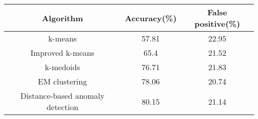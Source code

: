 \begin{table}[]
    \centering
    \begin{tabular}{@{}clllclcl@{}}
    \toprule
    \multicolumn{4}{c}{Algorithm}                          & \multicolumn{2}{c}{Accuracy(\%)} & \multicolumn{2}{c}{False positive(\%)} \\ \midrule
    \multicolumn{4}{c}{k-means}                            & \multicolumn{2}{c}{57.81}        & \multicolumn{2}{c}{22.95}              \\
    \multicolumn{4}{c}{Improved k-means}                   & \multicolumn{2}{c}{65.4}         & \multicolumn{2}{c}{21.52}              \\
    \multicolumn{4}{c}{k-medoids}                          & \multicolumn{2}{c}{76.71}        & \multicolumn{2}{c}{21.83}              \\
    \multicolumn{4}{c}{EM clustering}                      & \multicolumn{2}{c}{78.06}        & \multicolumn{2}{c}{20.74}              \\
    \multicolumn{4}{c}{Distance-based   anomaly detection} & \multicolumn{2}{c}{80.15}        & \multicolumn{2}{c}{21.14}              \\ \bottomrule
    \end{tabular}
    \end{table}





